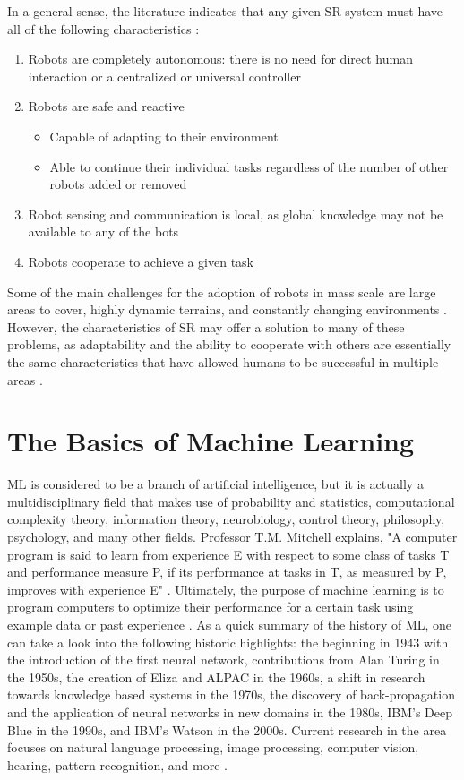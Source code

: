 \documentclass[twocolumn]{bmcart}%
\begin{document}
In a general sense, the literature indicates that any given SR system must have all of the following characteristics \cite{TEDx, Brambilla}: 
\begin{enumerate}
  \item Robots are completely autonomous: there is no need for direct human interaction or a centralized or universal controller
  \item Robots are safe and reactive
  \begin{itemize}
     \item Capable of adapting to their environment
     \item Able to continue their individual tasks regardless of the number of other robots added or removed
   \end{itemize}
  \item Robot sensing and communication is local, as global knowledge may not be available to any of the bots
  \item Robots cooperate to achieve a given task 
\end{enumerate} 

Some of the main challenges for the adoption of robots in mass scale are large areas to cover, highly dynamic terrains, and constantly changing environments \cite{Couceiro}. However, the characteristics of SR may offer a solution to many of these problems, as adaptability and the ability to cooperate with others are essentially the same characteristics that have allowed humans to be successful in multiple areas \cite{Henrich}. 

\section*{The Basics of Machine Learning}
ML is considered to be a branch of artificial intelligence, but it is actually a multidisciplinary field that makes use of probability and statistics, computational complexity theory, information theory, neurobiology, control theory, philosophy, psychology, and  many other fields. Professor T.M. Mitchell explains, "A computer program is said to learn from experience E with respect to some class of tasks T and performance measure P, if its performance at tasks in T, as measured by P, improves with experience E" \cite{Mitchell}. Ultimately, the purpose of machine learning is to program computers to optimize their performance for a certain task using example data or past experience \cite{Alpaydin}.  As a quick summary of the history of ML, one can take a look into the following historic highlights: the beginning in 1943 with the introduction of the first neural network, contributions from Alan Turing in the 1950s, the creation of Eliza and ALPAC in the 1960s, a shift in research towards knowledge based systems in the 1970s, the discovery of back-propagation and the application of neural networks in new domains in the 1980s, IBM's Deep Blue in the 1990s, and IBM's Watson in the 2000s. Current research in the area focuses on natural language processing, image processing, computer vision, hearing, pattern recognition, and more \cite{Mohammed}. 
\end{document}
